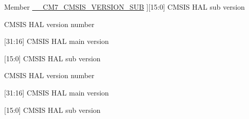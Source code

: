 \begin{DoxyRefList}
%
Member \hyperlink{core__cm7_8h_aeff13b17591f5ace9534759f9dd2fed3}{\+\_\+\+\_\+\+C\+M7\+\_\+\+C\+M\+S\+I\+S\+\_\+\+V\+E\+R\+S\+I\+O\+N\+\_\+\+S\+UB} ]\mbox{[}15\+:0\mbox{]} C\+M\+S\+IS H\+AL sub version  
\item[\label{deprecated__deprecated000036}%
\Hypertarget{deprecated__deprecated000036}%
Member \hyperlink{core__sc000_8h_a794ed22b926ab39924705178f2441270}{\+\_\+\+\_\+\+S\+C000\+\_\+\+C\+M\+S\+I\+S\+\_\+\+V\+E\+R\+S\+I\+ON} ]C\+M\+S\+IS H\+AL version number  
\item[\label{deprecated__deprecated000034}%
\Hypertarget{deprecated__deprecated000034}%
Member \hyperlink{core__sc000_8h_a9cca46bbd181abedd1cd6e84ef0b3cf4}{\+\_\+\+\_\+\+S\+C000\+\_\+\+C\+M\+S\+I\+S\+\_\+\+V\+E\+R\+S\+I\+O\+N\+\_\+\+M\+A\+IN} ]\mbox{[}31\+:16\mbox{]} C\+M\+S\+IS H\+AL main version  
\item[\label{deprecated__deprecated000035}%
\Hypertarget{deprecated__deprecated000035}%
Member \hyperlink{core__sc000_8h_af4db9bbe5ff5726d8a8c388e52d5685d}{\+\_\+\+\_\+\+S\+C000\+\_\+\+C\+M\+S\+I\+S\+\_\+\+V\+E\+R\+S\+I\+O\+N\+\_\+\+S\+UB} ]\mbox{[}15\+:0\mbox{]} C\+M\+S\+IS H\+AL sub version  
\item[\label{deprecated__deprecated000039}%
\Hypertarget{deprecated__deprecated000039}%
Member \hyperlink{core__sc300_8h_a2f960c3c99ab33e1cf4b5287821c44dd}{\+\_\+\+\_\+\+S\+C300\+\_\+\+C\+M\+S\+I\+S\+\_\+\+V\+E\+R\+S\+I\+ON} ]C\+M\+S\+IS H\+AL version number  
\item[\label{deprecated__deprecated000037}%
\Hypertarget{deprecated__deprecated000037}%
Member \hyperlink{core__sc300_8h_a0e2124db4f74f2b355904314accf1790}{\+\_\+\+\_\+\+S\+C300\+\_\+\+C\+M\+S\+I\+S\+\_\+\+V\+E\+R\+S\+I\+O\+N\+\_\+\+M\+A\+IN} ]\mbox{[}31\+:16\mbox{]} C\+M\+S\+IS H\+AL main version  
\item[\label{deprecated__deprecated000038}%
\Hypertarget{deprecated__deprecated000038}%
Member \hyperlink{core__sc300_8h_a664c9e59952455ddeee28173b864fe9d}{\+\_\+\+\_\+\+S\+C300\+\_\+\+C\+M\+S\+I\+S\+\_\+\+V\+E\+R\+S\+I\+O\+N\+\_\+\+S\+UB} ]\mbox{[}15\+:0\mbox{]} C\+M\+S\+IS H\+AL sub version 
\end{DoxyRefList}